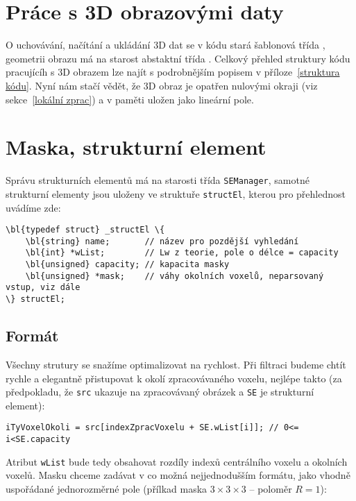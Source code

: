     \section{Práce s 3D obrazovými daty}

    O uchovávání, načítání a ukládání 3D dat se v kódu stará šablonová třída \Imageman, geometrii obrazu má na starost abstaktní třída \Imageinfo. Celkový přehled struktury kódu pracujícíh s 3D obrazem lze najít s podrobnějším popisem v příloze~\ref{struktura kódu}. Nyní nám stačí vědět, že 3D obraz je opatřen nulovými okraji (viz sekce~\ref{lokální zprac}) a v paměti uložen jako lineární pole.

    \section{Maska, strukturní element}

    Správu strukturních elementů má na starosti třída {\tt SEManager}, samotné strukturní elementy jsou uloženy ve struktuře {\tt structEl}, kterou pro přehlednost uvádíme zde:

    \begin{Verbatim}[commandchars = \\\{\}]
\bl{typedef struct} _structEl \{
    \bl{string} name;       // název pro pozdější vyhledání
    \bl{int} *wList;        // Lw z teorie, pole o délce = capacity
    \bl{unsigned} capacity; // kapacita masky
    \bl{unsigned} *mask;    // váhy okolních voxelů, neparsovaný vstup, viz dále
\} structEl;
    \end{Verbatim}

    \subsection{Formát}

    Všechny strutury se snažíme optimalizovat na rychlost. Při filtraci budeme chtít rychle a elegantně přistupovat k okolí zpracovávaného voxelu, nejlépe takto (za předpokladu, že {\tt src} ukazuje na zpracovávaný obrázek a {\tt SE} je strukturní element):

    \begin{Verbatim}
iTyVoxelOkoli = src[indexZpracVoxelu + SE.wList[i]]; // 0<= i<SE.capacity
    \end{Verbatim}

    Atribut {\tt wList} bude tedy obsahovat rozdíly indexů centrálního voxelu a okolních voxelů. Masku chceme zadávat v co možná nejjednodušším formátu, jako vhodně uspořádané jednorozměrné pole (přílkad maska $3\times 3\times3$ -- poloměr $R = 1$):

